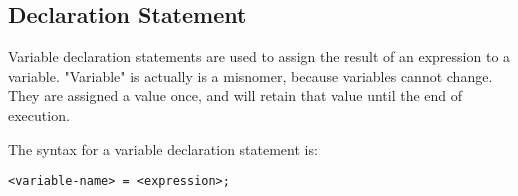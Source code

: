 
\subsection{Declaration Statement}
{
	Variable declaration statements are used to assign the result of an
	expression to a variable. "Variable" is actually is a misnomer, because
	variables cannot change. They are assigned a value once, and will retain
	that value until the end of execution.
	
	The syntax for a variable declaration statement is:
	\begin{lstlisting}[texcl = true, language = MAIA]
<variable-name> = <expression>;
	\end{lstlisting}
}
